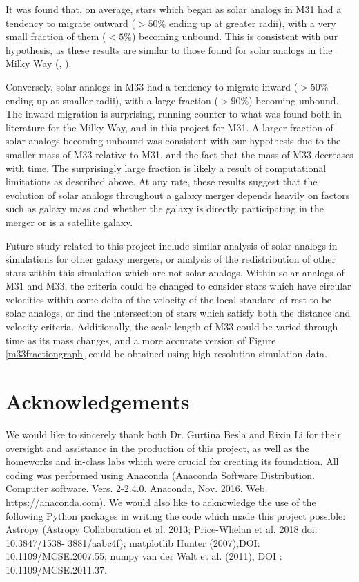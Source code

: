 \documentclass{aastex63}
\begin{document}
It was found that, on average, stars which began as solar analogs in M31 had a tendency to migrate outward ($>50\%$ ending up at greater radii), with a very small fraction of them ($<5\%$) becoming unbound. This is consistent with our hypothesis, as these results are similar to those found for solar analogs in the Milky Way (\cite{cox08}, \cite{van12}). 

Conversely, solar analogs in M33 had a tendency to migrate inward ($>50\%$ ending up at smaller radii), with a large fraction ($>90\%$) becoming unbound. The inward migration is surprising, running counter to what was found both in literature for the Milky Way, and in this project for M31. A larger fraction of solar analogs becoming unbound was consistent with our hypothesis due to the smaller mass of M33 relative to M31, and the fact that the mass of M33 decreases with time. The surprisingly large fraction is likely a result of computational limitations as described above. At any rate, these results suggest that the evolution of solar analogs throughout a galaxy merger depends heavily on factors such as galaxy mass and whether the galaxy is directly participating in the merger or is a satellite galaxy. 

Future study related to this project include similar analysis of solar analogs in simulations for other galaxy mergers, or analysis of the redistribution of other stars within this simulation which are not solar analogs. Within solar analogs of M31 and M33, the criteria could be changed to consider stars which have circular velocities within some delta of the velocity of the local standard of rest to be solar analogs, or find the intersection of stars which satisfy both the distance and velocity criteria. Additionally, the scale length of M33 could be varied through time as its mass changes, and a more accurate version of Figure \ref{m33fractiongraph} could be obtained using high resolution simulation data.

\section{Acknowledgements}

We would like to sincerely thank both Dr. Gurtina Besla and Rixin Li for their oversight and assistance in the production of this project, as well as the homeworks and in-class labs which were crucial for creating its foundation. All coding was performed using Anaconda (Anaconda Software Distribution. Computer software. Vers. 2-2.4.0. Anaconda, Nov. 2016. Web. https://anaconda.com). We would also like to acknowledge the use of the following Python packages in writing the code which made this project possible: Astropy (Astropy Collaboration et al. 2013; Price-Whelan et al. 2018 doi: 10.3847/1538-
3881/aabc4f); matplotlib Hunter (2007),DOI: 10.1109/MCSE.2007.55;  numpy van der Walt et al.  (2011), DOI : 10.1109/MCSE.2011.37. 
\end{document}
